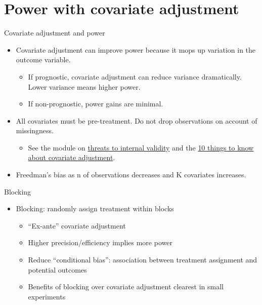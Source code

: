 \documentclass[
  ignorenonframetext,
]{beamer}
\providecommand{\tightlist}{%
  \setlength{\itemsep}{0pt}\setlength{\parskip}{0pt}}
\begin{document}
\hypertarget{power-with-covariate-adjustment-1}{%
\section{Power with covariate
adjustment}\label{power-with-covariate-adjustment-1}}

\begin{frame}{Covariate adjustment and power}
\protect\hypertarget{covariate-adjustment-and-power-1}{}
\begin{itemize}
\item
  Covariate adjustment can improve power because it mops up variation in
  the outcome variable.

  \begin{itemize}
  \item
    If prognostic, covariate adjustment can reduce variance
    dramatically. Lower variance means higher power.
  \item
    If non-prognostic, power gains are minimal.
  \end{itemize}
\item
  All covariates must be pre-treatment. Do not drop observations on
  account of missingness.

  \begin{itemize}
  \tightlist
  \item
    See the module on
    \href{threats-to-internal-validity-of-randomized-experiments.html}{threats
    to internal validity} and the
    \href{https://egap.org/resource/10-things-to-know-about-covariate-adjustment/}{10
    things to know about covariate adjustment}.
  \end{itemize}
\item
  Freedman's bias as n of observations decreases and K covariates
  increases.
\end{itemize}
\end{frame}

\begin{frame}{Blocking}
\protect\hypertarget{blocking}{}
\begin{itemize}
\item
  Blocking: randomly assign treatment within blocks

  \begin{itemize}
  \item
    ``Ex-ante'' covariate adjustment
  \item
    Higher precision/efficiency implies more power
  \item
    Reduce ``conditional bias'': association between treatment
    assignment and potential outcomes
  \item
    Benefits of blocking over covariate adjustment clearest in small
    experiments
  \end{itemize}
\end{itemize}
\end{frame}
\end{document}

